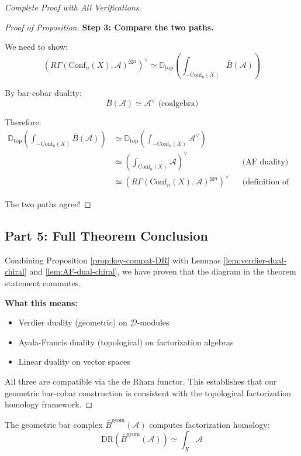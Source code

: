 \begin{proof}[Complete Proof with All Verifications]
\begin{proof}[Proof of Proposition]
\textbf{Step 3: Compare the two paths.}

We need to show:
$$\left(R\Gamma(\text{Conf}_n(X), \mathcal{A})^{\boxtimes n}\right)^\vee \simeq \mathbb{D}_{\text{top}}\left(\int_{-\text{Conf}_n(X)} \bar{B}(\mathcal{A})\right)$$

By bar-cobar duality:
$$\bar{B}(\mathcal{A}) \simeq \mathcal{A}^\vee \text{ (coalgebra)}$$

Therefore:
\begin{align*}
\mathbb{D}_{\text{top}}\left(\int_{-\text{Conf}_n(X)} \bar{B}(\mathcal{A})\right)
&\simeq \mathbb{D}_{\text{top}}\left(\int_{-\text{Conf}_n(X)} \mathcal{A}^\vee\right) \\
&\simeq \left(\int_{\text{Conf}_n(X)} \mathcal{A}\right)^\vee && \text{(AF duality)} \\
&\simeq \left(R\Gamma(\text{Conf}_n(X), \mathcal{A})^{\boxtimes n}\right)^\vee && \text{(definition of factorization homology)}
\end{align*}

The two paths agree! \qedhere
\end{proof}

\subsection*{Part 5: Full Theorem Conclusion}

Combining Proposition \ref{prop:key-compat-DR} with Lemmas \ref{lem:verdier-dual-chiral} and \ref{lem:AF-dual-chiral}, we have proven that the diagram in the theorem statement commutes.

\textbf{What this means:}
\begin{itemize}
\item Verdier duality (geometric) on $\mathcal{D}$-modules
\item Ayala-Francis duality (topological) on factorization algebras
\item Linear duality on vector spaces
\end{itemize}

All three are compatible via the de Rham functor. This establishes that our geometric bar-cobar construction is consistent with the topological factorization homology framework.
\end{proof}

\begin{corollary}\label{cor:bar-is-fh}
The geometric bar complex $\bar{B}^{\text{geom}}(\mathcal{A})$ computes factorization homology:
$$\text{DR}(\bar{B}^{\text{geom}}(\mathcal{A})) \simeq \int_X \mathcal{A}$$
\end{corollary}

